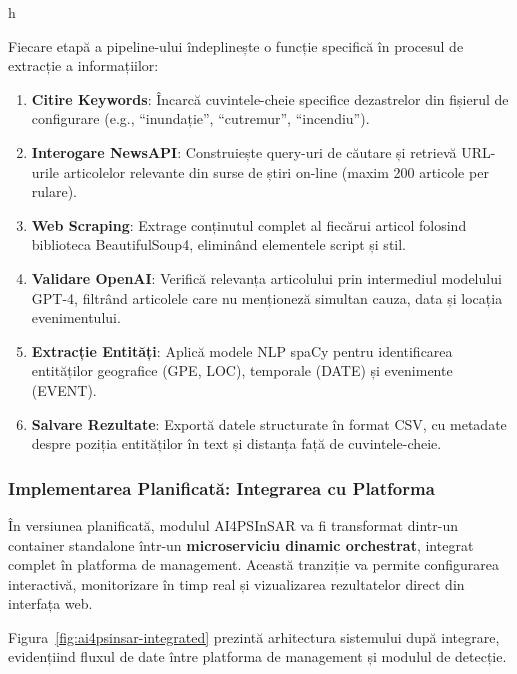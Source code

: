 h\documentclass[12pt,a4paper]{article}
\begin{document}
Fiecare etapă a pipeline-ului îndeplinește o funcție specifică în procesul de extracție a informațiilor:
\begin{enumerate}
    \item \textbf{Citire Keywords}: Încarcă cuvintele-cheie specifice dezastrelor din fișierul de configurare (e.g., ``inundație'', ``cutremur'', ``incendiu'').
    
    \item \textbf{Interogare NewsAPI}: Construiește query-uri de căutare și retrievă URL-urile articolelor relevante din surse de știri on-line (maxim 200 articole per rulare).
    
    \item \textbf{Web Scraping}: Extrage conținutul complet al fiecărui articol folosind biblioteca BeautifulSoup4, eliminând elementele script și stil.
    
    \item \textbf{Validare OpenAI}: Verifică relevanța articolului prin intermediul modelului GPT-4, filtrând articolele care nu menționeză simultan cauza, data și locația evenimentului.
    
    \item \textbf{Extracție Entități}: Aplică modele NLP spaCy pentru identificarea entităților geografice (GPE, LOC), temporale (DATE) și evenimente (EVENT).
    
    \item \textbf{Salvare Rezultate}: Exportă datele structurate în format CSV, cu metadate despre poziția entităților în text și distanța față de cuvintele-cheie.
\end{enumerate}


\subsubsection{Implementarea Planificată: Integrarea cu Platforma}
\hspace{1em} În versiunea planificată, modulul AI4PSInSAR va fi transformat dintr-un container standalone într-un \textbf{microserviciu dinamic orchestrat}, integrat complet în platforma de management. Această tranziție va permite configurarea interactivă, monitorizare în timp real și vizualizarea rezultatelor direct din interfața web.

Figura~\ref{fig:ai4psinsar-integrated} prezintă arhitectura sistemului după integrare, evidențiind fluxul de date între platforma de management și modulul de detecție.
\end{document}
